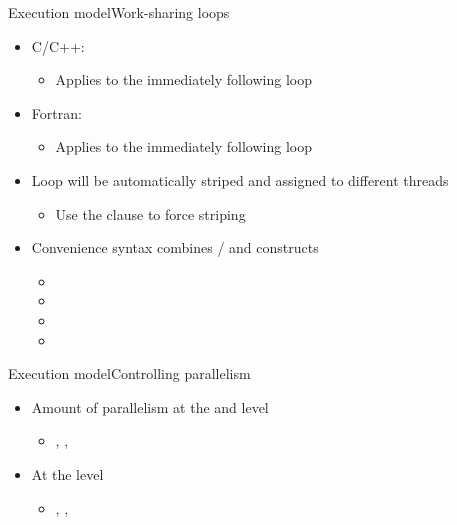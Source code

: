 \documentclass[12pt,aspectratio=169]{beamer}
\begin{document}
\begin{frame}{Execution model}{Work-sharing loops}
  \begin{itemize}
  \item C/C++: 
    \begin{itemize}
    \item Applies to the immediately following  loop
    \end{itemize}
  \item Fortran: 
    \begin{itemize}
    \item Applies to the immediately following  loop
    \end{itemize}
  \item Loop will be automatically striped and assigned to different threads
    \begin{itemize}
    \item Use the  clause to force striping
    \end{itemize}
  \item Convenience syntax combines
    / and 
    constructs
    \begin{itemize}
    \item {}
    \item {}
    \item {}
    \item {}
    \end{itemize}
  \end{itemize}
\end{frame}

\begin{frame}[fragile]{Execution model}{Controlling parallelism}
  \begin{itemize}
  \item Amount of parallelism at the  and
     level
    \begin{itemize}
    \item {}, ,
    \end{itemize}
  \item At the  level
    \begin{itemize}
    \item {}, , 
    \end{itemize}
  \end{itemize}

\end{frame}
\end{document}
